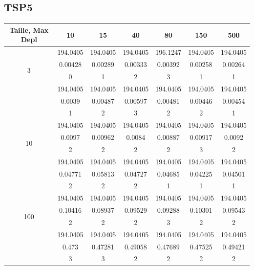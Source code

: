 \documentclass[12pt]{article}
\begin{document}
            \subsection{TSP5}
            \begin{tabular}{|c|c|c|c|c|c|c|}
                \hline
                {Taille, Max Depl} & 10 & 15 & 40 & 80 &  150 & 500 \\
                \hline
                \multirow{4}{*}{3} & 194.0405 & 194.0405 & 194.0405 & 196.1247 & 194.0405 & 194.0405  \\ & 0.00428 & 0.00289 & 0.00333 & 0.00392 & 0.00258 & 0.00264  \\ & 0 & 1 & 2 & 3 & 1 & 1  \\\hline
                \multirow{4}{*}{5} & 194.0405 & 194.0405 & 194.0405 & 194.0405 & 194.0405 & 194.0405  \\ & 0.0039 & 0.00487 & 0.00597 & 0.00481 & 0.00446 & 0.00454  \\ & 1 & 2 & 3 & 2 & 2 & 1  \\\hline
                \multirow{4}{*}{10} & 194.0405 & 194.0405 & 194.0405 & 194.0405 & 194.0405 & 194.0405  \\ & 0.0097 & 0.00962 & 0.0084 & 0.00887 & 0.00917 & 0.0092  \\ & 2 & 2 & 2 & 2 & 3 & 2  \\\hline
                \multirow{4}{*}{50} & 194.0405 & 194.0405 & 194.0405 & 194.0405 & 194.0405 & 194.0405  \\ & 0.04771 & 0.05813 & 0.04727 & 0.04685 & 0.04225 & 0.04501  \\ & 2 & 2 & 2 & 1 & 1 & 1  \\\hline
                \multirow{4}{*}{100} & 194.0405 & 194.0405 & 194.0405 & 194.0405 & 194.0405 & 194.0405  \\ & 0.10416 & 0.08937 & 0.09529 & 0.09288 & 0.10301 & 0.09543  \\ & 2 & 2 & 2 & 3 & 2 & 2  \\\hline 
                \multirow{4}{*}{500} & 194.0405 & 194.0405 & 194.0405 & 194.0405 & 194.0405 & 194.0405  \\ & 0.473 & 0.47281 & 0.49058 & 0.47689 & 0.47525 & 0.49421  \\ & 3 & 3 & 2 & 2 & 2 & 2  \\\hline
            \end{tabular}
\end{document}
